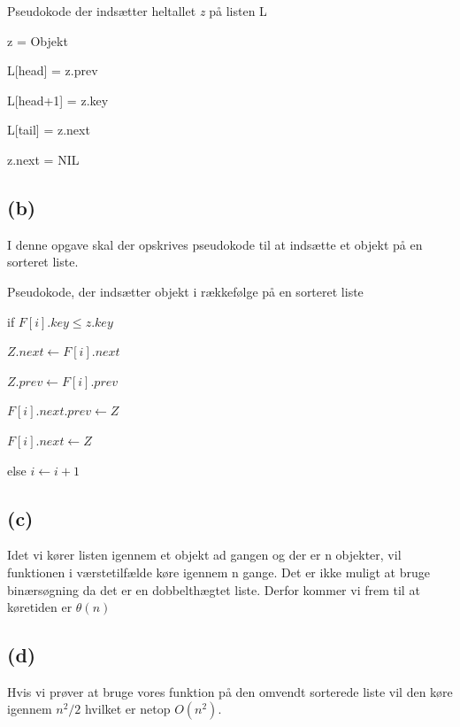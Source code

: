 \documentclass[a4paper,10pt]{article}
\begin{document}
\begin{algorithm}
\caption{Pseudokode der indsætter heltallet \textit{z} på listen L}
\begin{algorithmic}[1]
\State \parbox[t]{.7\linewidth}{z = Objekt}
\State \parbox[t]{.7\linewidth}{L[head] = z.prev}
\State \parbox[t]{.7\linewidth}{L[head+1] = z.key}
\State \parbox[t]{.7\linewidth}{L[tail] = z.next}
\State \parbox[t]{.7\linewidth}{z.next = NIL}
\EndFunction
\end{algorithmic}
\end{algorithm}



\subsection*{(b)}
I denne opgave skal der opskrives pseudokode til at indsætte et objekt på en sorteret liste. 

\begin{algorithm}[H]
\caption{Pseudokode, der indsætter objekt i rækkefølge på en sorteret liste}
\begin{algorithmic}[2]
\State \parbox[t]{.7\linewidth}{if $F[i].key \leq z.key $}
\Indent
\State \parbox[t]{.7\linewidth}{$Z.next \gets F[i].next $}
\State \parbox[t]{.7\linewidth}{$Z.prev \gets F[i].prev $}
\State \parbox[t]{.7\linewidth}{$F[i].next.prev \gets Z $}
\State \parbox[t]{.7\linewidth}{$F[i].next \gets Z $}
\State {}
\EndIndent
\State \parbox[t]{.7\linewidth}{else $i \gets i+1$}
\EndFunction
\end{algorithmic}
\end{algorithm}

\subsection*{(c)}
Idet vi kører listen igennem et objekt ad gangen og der er n objekter, vil funktionen i værstetilfælde køre igennem n gange. Det er ikke muligt at bruge binærsøgning da det er en dobbelthægtet liste. Derfor kommer vi frem til at køretiden er $\theta (n)$



\subsection*{(d)}
Hvis vi prøver at bruge vores funktion på den omvendt sorterede liste vil den køre igennem $n^2/2$ hvilket er netop $O(n^2)$. 
\end{document}
